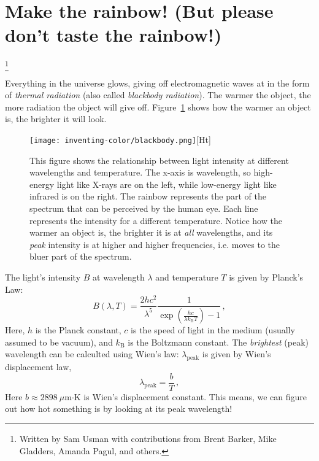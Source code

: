 \section{Make the rainbow! (But please don't taste the rainbow!)}
\footnote{Written by Sam Usman with contributions from Brent Barker, Mike
Gladders, Amanda Pagul, and others.}

Everything in the universe glows, giving off electromagnetic waves at in the
form of \emph{thermal radiation} (also called \emph{blackbody radiation}). The
warmer the object, the more radiation the object will give off.
Figure~\ref{fig:blackbody} shows how the warmer an object is, the brighter it will
look.

\nopagebreak

\begin{figure}
\label{fig:blackbody}
       \centering
       \texttt{[image: inventing-color/blackbody.png]}[Ht]
       \caption{This figure shows the relationship between light intensity at
different wavelengths and temperature. The x-axis is wavelength, so high-energy
light like X-rays are on the left, while low-energy light like infrared is on
the right. The rainbow represents the part of the spectrum that can be
perceived by the human eye. Each line represents the intensity for a different
temperature. Notice how the warmer an object is, the brighter it is at
\emph{all} wavelengths, and its \emph{peak} intensity is at higher and higher
frequencies, i.e. moves to the bluer part of the spectrum.} 
\end{figure}

%

The light's intensity $B$ at wavelength $\lambda$ and
temperature $T$ is given by Planck's Law:
%
\begin{equation}\label{ic:eq:planck}
 B(\lambda, T) = \frac{2 h c^2}{\lambda^5}
 \frac{1}{\exp\left( \frac{hc}{\lambda k_\textrm{B} T} \right) - 1} \,,
\end{equation}
%
Here, $h$ is the Planck constant, $c$ is the speed of light in the medium
(usually assumed to be vacuum), and $k_\textrm{B}$ is the Boltzmann constant.
The \emph{brightest} (peak) wavelength can be calculted using Wien's law:
$\lambda_\textrm{peak}$ is given by Wien's displacement law,
%
\begin{equation}\label{ic:eq:wien}
	\lambda_\textrm{peak} = \frac{b}{T} \,,
\end{equation}
%
Here $b \approx 2898\:\mu$m$\cdot$K is Wien's displacement constant.
This means, we can figure out how hot something is by looking at its peak
wavelength!

